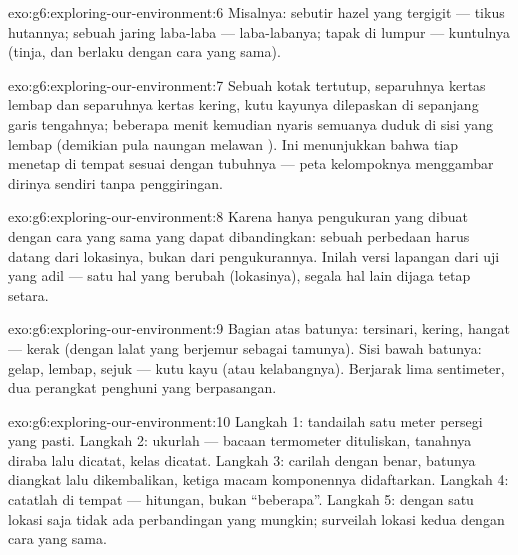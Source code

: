 \begin{solution}{exo:g6:exploring-our-environment:6}
Misalnya: sebutir  hazel yang tergigit --- tikus hutannya; sebuah
jaring laba-laba --- laba-labanya; tapak di lumpur --- kuntulnya
(tinja,  dan  berlaku dengan cara yang sama).
\end{solution}

\begin{solution}{exo:g6:exploring-our-environment:7}
Sebuah kotak tertutup, separuhnya kertas lembap dan separuhnya kertas
kering, kutu kayunya dilepaskan di sepanjang garis tengahnya; beberapa
menit kemudian nyaris semuanya duduk di sisi yang lembap (demikian
pula naungan melawan ). Ini menunjukkan bahwa tiap 
menetap di tempat  sesuai dengan tubuhnya --- peta
kelompoknya menggambar dirinya sendiri tanpa penggiringan.
\end{solution}

\begin{solution}{exo:g6:exploring-our-environment:8}
Karena hanya pengukuran yang dibuat dengan cara yang sama yang dapat
dibandingkan: sebuah perbedaan harus datang dari lokasinya, bukan dari
pengukurannya. Inilah versi lapangan dari uji yang adil --- satu hal
yang berubah (lokasinya), segala hal lain dijaga tetap setara.
\end{solution}

\begin{solution}{exo:g6:exploring-our-environment:9}
Bagian atas batunya: tersinari, kering, hangat ---  kerak (dengan
lalat yang berjemur sebagai tamunya). Sisi bawah batunya: gelap,
lembap, sejuk --- kutu kayu (atau kelabangnya). Berjarak lima
sentimeter, dua perangkat penghuni yang berpasangan.
\end{solution}

\begin{solution}{exo:g6:exploring-our-environment:10}
Langkah 1: tandailah satu meter persegi yang pasti. Langkah 2:
ukurlah --- bacaan termometer dituliskan,  tanahnya diraba
lalu dicatat, kelas  dicatat. Langkah 3: carilah dengan
benar, batunya diangkat lalu dikembalikan, ketiga macam komponennya
didaftarkan. Langkah 4: catatlah di tempat --- hitungan, bukan
``beberapa''. Langkah 5: dengan satu lokasi saja tidak ada
perbandingan yang mungkin; surveilah lokasi kedua dengan cara yang
sama.
\end{solution}

